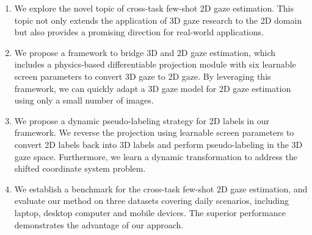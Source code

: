 \begin{enumerate}
    
    \item We explore the novel topic of cross-task few-shot 2D gaze estimation. This topic not only extends the application of 3D gaze research to the 2D domain but also provides a promising direction for real-world applications.
    
    \item We propose a framework to bridge 3D and 2D gaze estimation, which includes a physics-based differentiable projection module with six learnable screen parameters to convert 3D gaze to 2D gaze.
    By leveraging this framework, we can quickly adapt a 3D gaze model for 2D gaze estimation using only a small number of images. 

    \item We propose a dynamic pseudo-labeling strategy for 2D labels in our framework. We reverse the projection using learnable screen parameters to convert 2D labels back into 3D labels and perform pseudo-labeling in the 3D gaze space. Furthermore, we learn a dynamic transformation to address the shifted coordinate system problem.
    
    
    \item We establish a benchmark for the cross-task few-shot 2D gaze estimation, and evaluate our method on three datasets covering daily scenarios, including laptop, desktop computer and mobile devices. The superior performance demonstrates the advantage of our approach.

\end{enumerate}

